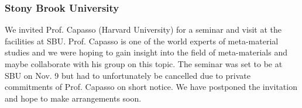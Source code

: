 \subsubsection{Stony Brook University} 
We invited Prof. Capasso (Harvard University) for a seminar and visit at the facilities at SBU. Prof. Capasso is one of the world experts of meta-material studies and we were hoping to gain insight into the field of meta-materials and maybe collaborate with his group on this topic. The seminar was set to be at SBU on Nov. 9 but had to unfortunately be cancelled due to private commitments of Prof. Capasso on short notice. We have postponed the invitation and hope to make arrangements soon.